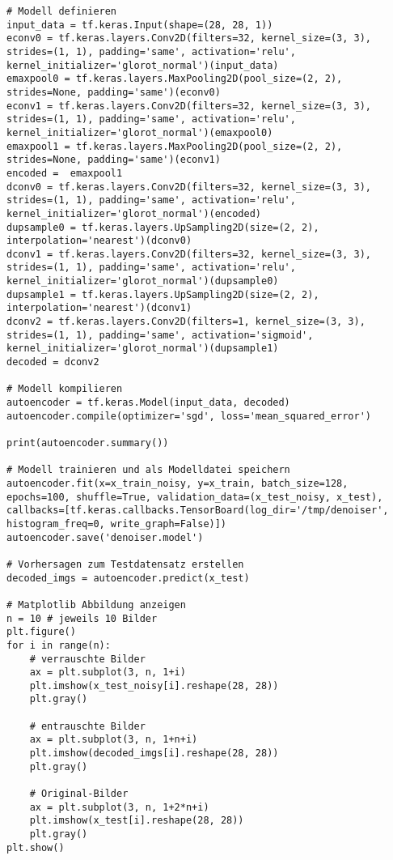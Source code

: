 \begin{appendices}
\begin{verbatim}
# Modell definieren
input_data = tf.keras.Input(shape=(28, 28, 1))
econv0 = tf.keras.layers.Conv2D(filters=32, kernel_size=(3, 3), strides=(1, 1), padding='same', activation='relu', kernel_initializer='glorot_normal')(input_data)
emaxpool0 = tf.keras.layers.MaxPooling2D(pool_size=(2, 2), strides=None, padding='same')(econv0)
econv1 = tf.keras.layers.Conv2D(filters=32, kernel_size=(3, 3), strides=(1, 1), padding='same', activation='relu', kernel_initializer='glorot_normal')(emaxpool0)
emaxpool1 = tf.keras.layers.MaxPooling2D(pool_size=(2, 2), strides=None, padding='same')(econv1)
encoded =  emaxpool1
dconv0 = tf.keras.layers.Conv2D(filters=32, kernel_size=(3, 3), strides=(1, 1), padding='same', activation='relu', kernel_initializer='glorot_normal')(encoded)
dupsample0 = tf.keras.layers.UpSampling2D(size=(2, 2), interpolation='nearest')(dconv0)
dconv1 = tf.keras.layers.Conv2D(filters=32, kernel_size=(3, 3), strides=(1, 1), padding='same', activation='relu', kernel_initializer='glorot_normal')(dupsample0)
dupsample1 = tf.keras.layers.UpSampling2D(size=(2, 2), interpolation='nearest')(dconv1)
dconv2 = tf.keras.layers.Conv2D(filters=1, kernel_size=(3, 3), strides=(1, 1), padding='same', activation='sigmoid', kernel_initializer='glorot_normal')(dupsample1)
decoded = dconv2

# Modell kompilieren
autoencoder = tf.keras.Model(input_data, decoded)
autoencoder.compile(optimizer='sgd', loss='mean_squared_error')

print(autoencoder.summary())

# Modell trainieren und als Modelldatei speichern
autoencoder.fit(x=x_train_noisy, y=x_train, batch_size=128, epochs=100, shuffle=True, validation_data=(x_test_noisy, x_test), callbacks=[tf.keras.callbacks.TensorBoard(log_dir='/tmp/denoiser', histogram_freq=0, write_graph=False)])
autoencoder.save('denoiser.model')

# Vorhersagen zum Testdatensatz erstellen
decoded_imgs = autoencoder.predict(x_test)

# Matplotlib Abbildung anzeigen
n = 10 # jeweils 10 Bilder
plt.figure()
for i in range(n):
    # verrauschte Bilder
    ax = plt.subplot(3, n, 1+i)
    plt.imshow(x_test_noisy[i].reshape(28, 28))
    plt.gray()

    # entrauschte Bilder
    ax = plt.subplot(3, n, 1+n+i)
    plt.imshow(decoded_imgs[i].reshape(28, 28))
    plt.gray()

    # Original-Bilder
    ax = plt.subplot(3, n, 1+2*n+i)
    plt.imshow(x_test[i].reshape(28, 28))
    plt.gray()
plt.show()
\end{verbatim}


\end{appendices}

